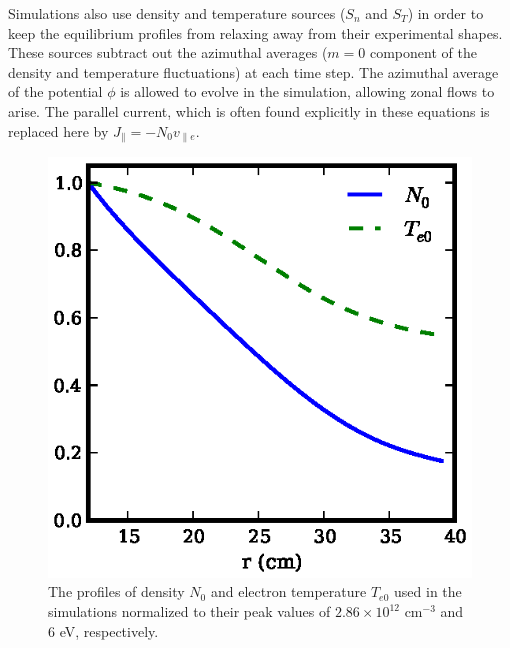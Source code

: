 \documentclass[showpacs,preprintnumbers,amsmath,amssymb,superscriptaddress,aip]{revtex4-1}
\def\para{\parallel}
\newcommand{\vpe}{v_{\parallel e}}
\begin{document}
Simulations also use density and temperature sources ($S_n$ and $S_T$) in order to keep the equilibrium profiles from relaxing away from their experimental shapes. 
These sources subtract out the azimuthal averages ($m=0$ component of the density and temperature fluctuations) at each time step. 
The azimuthal average of the potential $\phi$ is allowed to evolve in
the simulation, allowing zonal flows to arise.
The parallel current, which is often found explicitly in these equations is replaced here by $J_\para = - N_0 \vpe$. \\

\begin{figure}[!htbp]
\includegraphics[]{equilibrium_profiles}
\hfil
\caption{The profiles of density $N_0$ and electron temperature $T_{e0}$ used in the simulations normalized to their peak values of $2.86 \times 10^{12}$ cm$^{-3}$ and 
$6$ eV, respectively.}
\label{eq_profiles}
\end{figure}
\end{document}
